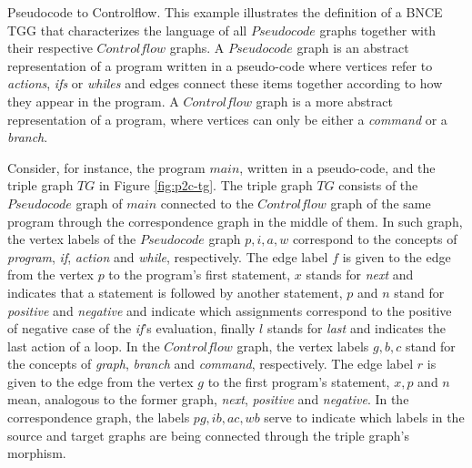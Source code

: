 \documentclass[]{report}
\begin{document}
\begin{example}{Pseudocode to Controlflow.}
	\label{ex:pseudocode2controlflow}
	This example illustrates the definition of a BNCE TGG that characterizes the language of all $Pseudocode$ graphs together with their respective $Controlflow$ graphs. A $Pseudocode$ graph is an abstract representation of a program written in a pseudo-code where vertices refer to \textit{actions}, \textit{ifs} or \textit{whiles} and edges connect these items together according to how they appear in the program. A $Controlflow$ graph is a more abstract representation of a program, where vertices can only be either a \textit{command} or a \textit{branch}.
	
	Consider, for instance, the program $main$, written in a pseudo-code, and the triple graph $TG$ in Figure \ref{fig:p2c-tg}. The triple graph $TG$ consists of the $Pseudocode$ graph of $main$ connected to the $Controlflow$ graph of the same program through the correspondence graph in the middle of them. In such graph, the vertex labels of the $Pseudocode$ graph $p, i, a, w$ correspond to the concepts of \textit{program}, \textit{if}, \textit{action} and \textit{while}, respectively. The edge label $f$ is given to the edge from the vertex $p$ to the program's first statement, $x$ stands for \textit{next} and indicates that a statement is followed by another statement, $p$ and $n$ stand for \textit{positive} and \textit{negative} and indicate which assignments correspond to the positive of negative case of the \textit{if}'s evaluation, finally $l$ stands for \textit{last} and indicates the last action of a loop. In the $Controlflow$ graph, the vertex labels $g, b, c$ stand for the concepts of \textit{graph}, \textit{branch} and \textit{command}, respectively. The edge label $r$ is given to the edge from the vertex $g$ to the first program's statement, $x, p$ and $n$ mean, analogous to the former graph, \textit{next}, \textit{positive} and \textit{negative}. In the correspondence graph, the labels $pg, ib, ac, wb$ serve to indicate which labels in the source and target graphs are being connected through the triple graph's morphism.
	
	
	

\end{example}
\end{document}

